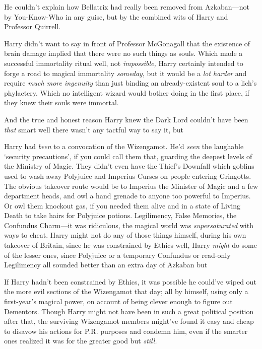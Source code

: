 He couldn't explain how Bellatrix had really been removed from Azkaban---not by
You-Know-Who in any guise, but by the combined wits of Harry and Professor
Quirrell.

Harry didn't want to say in front of Professor McGonagall that the existence of
brain damage implied that there were no such things as souls. Which made a
successful immortality ritual{\el} well, not \emph{impossible,} Harry
certainly intended to forge a road to magical immortality \emph{someday}, but
it would be a \emph{lot harder} and require \emph{much more ingenuity} than
just binding an already-existent soul to a lich's phylactery. Which no
intelligent wizard would bother doing in the first place, if they knew their
souls were immortal.

And the true and honest reason Harry knew the Dark Lord couldn't have been
\emph{that} smart{\el} well{\el} there wasn't any tactful way to say it,
but{\el}

Harry had \emph{been} to a convocation of the Wizengamot. He'd \emph{seen} the
laughable `security precautions', if you could call them that, guarding the
deepest levels of the Ministry of Magic. They didn't even have the Thief's
Downfall which goblins used to wash away Polyjuice and Imperius Curses on
people entering Gringotts. The obvious takeover route would be to Imperius the
Minister of Magic and a few department heads, and owl a hand grenade to anyone
too powerful to Imperius. Or owl them knockout gas, if you needed them alive
and in a state of Living Death to take hairs for Polyjuice potions.
Legilimency, False Memories, the Confundus Charm---it was ridiculous, the
magical world was \emph{supersaturated} with ways to cheat. Harry might not do
any of those things himself, during his own takeover of Britain, since he was
constrained by Ethics{\el} well, Harry \emph{might} do some of the lesser
ones, since Polyjuice or a temporary Confundus or read-only Legilimency all
sounded better than an extra day of Azkaban{\el} but{\el}

If Harry hadn't been constrained by Ethics, it was possible he could've wiped
out the more evil sections of the Wizengamot that day; all by himself, using only
a first-year's magical power, on account of being clever enough to figure out
Dementors. Though Harry might not have been in such a great political position
after that, the surviving Wizengamot members might've found it easy and cheap
to disavow his actions for P.R. purposes and condemn him, even if the smarter
ones realized it was for the greater good{\el} but \emph{still.}

